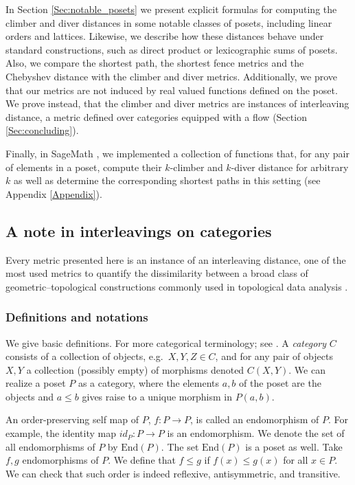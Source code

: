 \documentclass{article}[12pt]
\theoremstyle{exampstyle}
\theoremstyle{remark}
\newcommand{\End}{\text{End}}
\begin{document}
In Section \ref{Sec:notable_posets} we present explicit formulas for computing the climber and diver distances in some notable classes of posets, including linear orders and lattices. Likewise, we describe how these distances behave under standard constructions, such as direct product or lexicographic sums of posets. Also, we compare the shortest path, the shortest fence metrics and the Chebyshev distance with the climber and diver metrics. Additionally, we prove that our metrics are not induced by real valued functions defined on the poset. We prove instead, that the climber and diver metrics are instances of interleaving distance, a metric defined over categories equipped with a flow (Section \ref{Sec:concluding}).

Finally, in SageMath \cite{sagemath}, we implemented a collection of functions that, for any pair of elements in a poset, compute their $k$-climber and $k$-diver distance for arbitrary $k$ as well as determine the corresponding shortest paths in this setting (see Appendix \ref{Appendix}).


\subsection{A note in interleavings on categories}

Every metric presented here is an instance of an interleaving distance, one of the most used metrics to quantify the dissimilarity between a broad class of geometric–topological constructions commonly used in topological data analysis \cite{Flow}.

\subsubsection*{Definitions and notations}

We give basic definitions. For more categorical terminology; see \cite{riehl2017category}.  A \emph{category} $C$ consists of a collection of objects, e.g.~$X,Y,Z \in C$, and for any pair of objects $X,Y$ a collection (possibly empty) of morphisms denoted $C(X,Y)$. We can realize a poset $P$ as a category, where the elements $a,b$ of the poset are the objects and $a \leq b$ gives raise to a unique morphism in $P(a, b)$. 

An order-preserving self map of $P$, $f: P \to P$, is called an endomorphism of $P$. For example, the identity map $id_P: P \to P$ is an endomorphism. We denote the set of all endomorphisms of $P$ by $\End(P)$. The set $\End(P)$ is a poset as well. Take $f,g$ endomorphisms of $P$. We define that $f \leq g$ if $f(x) \leq g(x)$ for all $x \in P$. We can check that such order is indeed reflexive, antisymmetric, and transitive.
 
\end{document}
